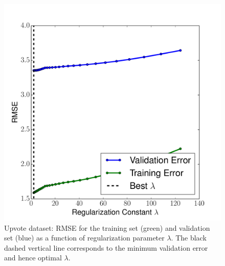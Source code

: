 \documentclass[12pt]{amsart}
\begin{document}
\begin{figure}
	\includegraphics[width=\columnwidth]{upvote_rmse.pdf}
    \caption{Upvote dataset: RMSE for the training set (green) and validation set (blue) as a function of regularization parameter $\lambda$.  The black dashed vertical line corresponds to the minimum validation error and hence optimal $\lambda$.}
    \label{fig:yelp_upvote_rmse}
\end{figure}
\end{document}
